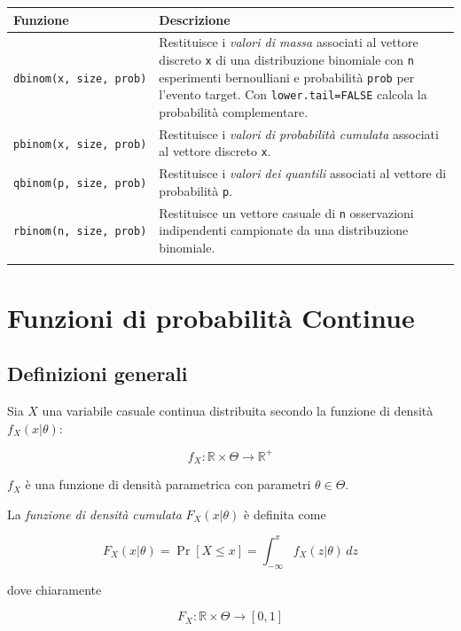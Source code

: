 \documentclass[
  ignorenonframetext,
  italian,
  compress, aspectratio=149]{beamer}
\begin{document}
\begin{frame}[fragile]{}
\label{section-8}
\begin{longtable}[]{@{}
  >{\raggedright\arraybackslash}p{}
  >{\raggedright\arraybackslash}p{}@{}}
\toprule\noalign{}
\begin{minipage}[b]{\linewidth}\raggedright
Funzione
\end{minipage} & \begin{minipage}[b]{\linewidth}\raggedright
Descrizione
\end{minipage} \\
\midrule\noalign{}
\endhead
\texttt{dbinom(x,\ size,\ prob)} & Restituisce i \emph{valori di massa}
associati al vettore discreto \texttt{x} di una distribuzione binomiale
con \texttt{n} esperimenti bernoulliani e probabilità \texttt{prob} per
l'evento target. Con \texttt{lower.tail=FALSE} calcola la probabilità
complementare. \\
\texttt{pbinom(x,\ size,\ prob)} & Restituisce i \emph{valori di
probabilità cumulata} associati al vettore discreto \texttt{x}. \\
\texttt{qbinom(p,\ size,\ prob)} & Restituisce i \emph{valori dei
quantili} associati al vettore di probabilità \texttt{p}. \\
\texttt{rbinom(n,\ size,\ prob)} & Restituisce un vettore casuale di
\texttt{n} osservazioni indipendenti campionate da una distribuzione
binomiale. \\
\bottomrule\noalign{}
\end{longtable}
\end{frame}

\section{Funzioni di probabilità
Continue}\label{funzioni-di-probabilituxe0-continue}

\subsection{Definizioni generali}\label{definizioni-generali-1}

\begin{frame}{}
\label{section-9}
Sia \(X\) una variabile casuale continua distribuita secondo la funzione
di densità \(f_X(x|\theta)\):

\[f_X : \mathbb{R} \times \Theta \to \mathbb{R}^+\]

\(f_X\) è una funzione di densità parametrica con parametri
\(\theta \in \Theta\).

La \emph{funzione di densità cumulata} \(F_X(x|\theta)\) è definita come

\[F_X(x|\theta) = \Pr[X \leq x]
= \int_{-\infty}^x f_X(z|\theta)\,dz\]

dove chiaramente

\[F_X : \mathbb{R} \times \Theta \to [0,1]\]
\end{frame}
\end{document}
